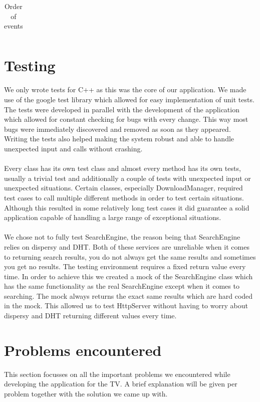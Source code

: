 \begin{table}
\begin{tabular}{| l | l | p{8 cm} |}
\end{tabular}
\caption{Order of events}
\label{tab:planning}
\end{table}


\section{Testing}

We only wrote tests for C++ as this was the core of our application. We made use of the google test library which allowed for easy implementation of unit tests. The tests were developed in parallel with the development of the application which allowed for constant checking for bugs with every change. This way most bugs were immediately discovered and removed as soon as they appeared. Writing the tests also helped making the system robust and able to handle unexpected input and calls without crashing.
\\\\
Every class has its own test class and almost every method has its own tests, usually a trivial test and additionally a couple of tests with unexpected input or unexpected situations. Certain classes, especially DownloadManager, required test cases to call multiple different methods in order to test certain situations. Although this resulted in some relatively long test cases it did guarantee a solid application capable of handling a large range of exceptional situations.
\\\\
We chose not to fully test SearchEngine, the reason being that SearchEngine relies on dispersy and DHT. Both of these services are unreliable when it comes to returning search results, you do not always get the same results and sometimes you get no results. The testing environment requires a fixed return value every time. In order to achieve this we created a mock of the SearchEngine class which has the same functionality as the real SearchEngine except when it comes to searching. The mock always returns the exact same results which are hard coded in the mock. This allowed us to test HttpServer without having to worry about dispersy and DHT returning different values every time.

\section{Problems encountered}
This section focusses on all the important problems we encountered while developing the application for the TV. A brief explanation will be given per problem together with the solution we came up with.

